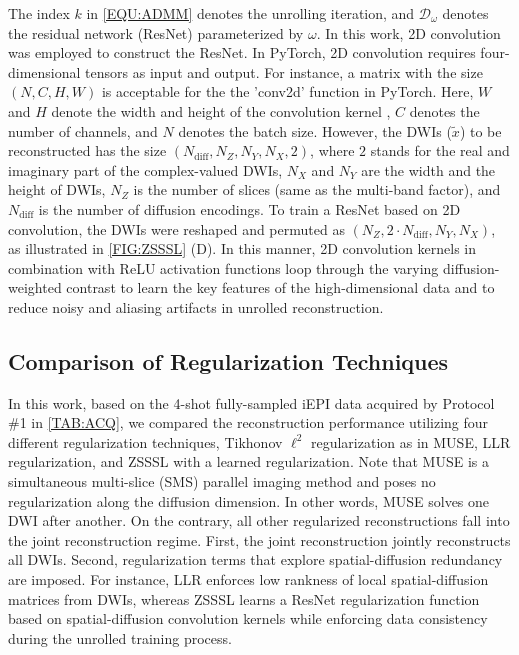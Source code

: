 \documentclass[journal,twoside,web]{ieeecolor}
\begin{document}
    The index $k$ in \cref{EQU:ADMM} denotes the unrolling iteration,
    and $\mathcal{D}_{\omega}$ denotes the residual network (ResNet) \cite{he_2016_resnet}
    parameterized by $\omega$.
	In this work, 2D convolution was employed to construct the ResNet.
	In PyTorch, 2D convolution requires four-dimensional tensors as input and output.
	For instance, a matrix with the size $(N, C, H, W)$ is acceptable
	for the the 'conv2d' function in PyTorch.
	Here, $W$ and $H$ denote the width and height of the convolution kernel ,
	$C$ denotes the number of channels, and $N$ denotes the batch size.
	However, the DWIs ($\tilde{x}$) to be reconstructed
	has the size $(N_{\text{diff}}, N_Z, N_Y, N_X, 2)$,
	where $2$ stands for the real and imaginary part of the complex-valued DWIs,
	$N_X$ and $N_Y$ are the width and the height of DWIs,
	$N_Z$ is the number of slices (same as the multi-band factor), and
	$N_{\text{diff}}$ is the number of diffusion encodings.
	To train a ResNet based on 2D convolution, the DWIs were reshaped and permuted
	as $(N_Z, 2 \cdot N_{\text{diff}}, N_Y, N_X)$, as illustrated in \cref{FIG:ZSSSL} (D).
	In this manner, 2D convolution kernels in combination with ReLU activation functions
	loop through the varying diffusion-weighted contrast
	to learn the key features of the high-dimensional data and
	to reduce noisy and aliasing artifacts in unrolled reconstruction.

	\subsection{Comparison of Regularization Techniques}

	In this work, based on the 4-shot fully-sampled iEPI \cite{butts_1993_iepi} data
	acquired by Protocol \#1 in \cref{TAB:ACQ},
	we compared the reconstruction performance
	utilizing four different regularization techniques,
	Tikhonov $\ell^2$ regularization as in MUSE,
	LLR regularization,
	and ZSSSL with a learned regularization.
	Note that MUSE is a simultaneous multi-slice (SMS) parallel imaging method
	and poses no regularization along the diffusion dimension.
	In other words, MUSE solves one DWI after another.
	On the contrary, all other regularized reconstructions
	fall into the joint reconstruction regime.
	First, the joint reconstruction jointly reconstructs all DWIs.
	Second, regularization terms that explore spatial-diffusion redundancy are imposed.
	For instance, LLR enforces low rankness of local spatial-diffusion matrices from DWIs,
	whereas ZSSSL learns a ResNet regularization function
	based on spatial-diffusion convolution kernels
	while enforcing data consistency during the unrolled training process.
\end{document}
